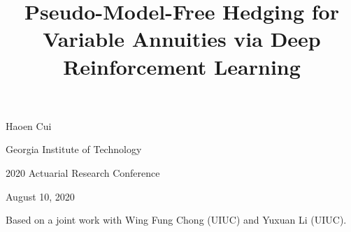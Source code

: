 \documentclass[10pt]{beamer}
\title{Pseudo-Model-Free Hedging for Variable Annuities via Deep Reinforcement Learning}
\author{}
\date{}
\theoremstyle{definition}
\begin{document}
\begin{frame}
\maketitle
\vspace{-2.8cm}
\begin{center}
Haoen Cui
\vspace{0.1cm}

\begin{small}
Georgia Institute of Technology
\end{small}
\vspace{0.5cm}

2020 Actuarial Research Conference
\vspace{0.1cm}

\begin{small}
August 10, 2020
\end{small}

\vspace{0.5cm}
\begin{small}
Based on a joint work with Wing Fung Chong (UIUC) and Yuxuan Li (UIUC).
\end{small}
\end{center}
\end{frame}
\end{document}
